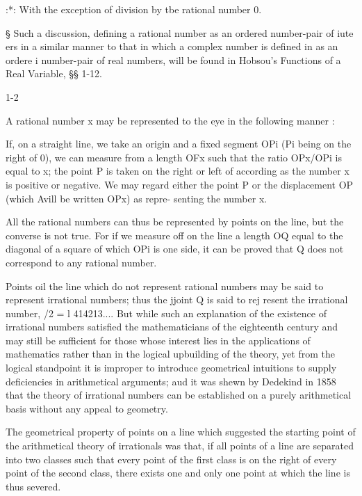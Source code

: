 :*: With the exception of division by tbe rational number 0.

§ Such a discussion, defining a rational number as an ordered
number-pair of iute ers in a similar manner to that in which a complex
number is defined in as an ordere i number-pair of real numbers,
will be found in Hobsou's Functions of a Real Variable, §§ 1-12.

1-2

%
%

A rational number x may be represented to the eye in the following
manner :

If, on a straight line, we take an origin and a fixed segment OPi (Pi
being on the right of 0), we can measure from a length OFx such that
the ratio OPx/OPi is equal to x; the point P is taken on the right or
left of according as the number x is positive or negative. We may
regard either the point P or the displacement OP (which Avill be
written OPx) as repre- senting the number x.

All the rational numbers can thus be represented by points on the
line, but the converse is not true. For if we measure off on the line
a length OQ equal to the diagonal of a square of which OPi is one
side, it can be proved that Q does not correspond to any rational
number.

Points oil the line which do not represent rational numbers may be
said to represent irrational numbers; thus the jjoint Q is said to
rej resent the irrational number, /2 = l 414213.... But while such
an explanation of the existence of irrational numbers satisfied the
mathematicians of the eighteenth century and may still be sufficient
for those whose interest lies in the applications of mathematics
rather than in the logical upbuilding of the theory, yet from the
logical standpoint it is improper to introduce geometrical intuitions
to supply deficiencies in arithmetical arguments; aud it was shewn by
Dedekind in 1858 that the theory of irrational numbers can be
established on a purely arithmetical basis without any appeal to
geometry.


The geometrical property of points on a line which suggested the
starting point of the arithmetical theory of irrationals was that, if
all points of a line are separated into two classes such that every
point of the first class is on the right of every point of the second
class, there exists one and only one point at which the line is thus
severed.

